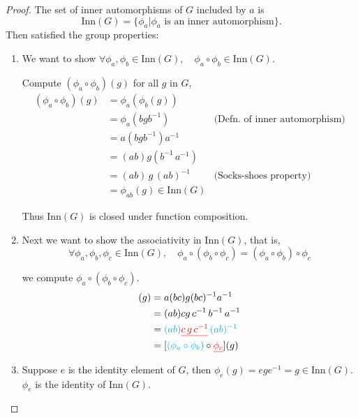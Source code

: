  \begin{proof}
     The set of inner automorphisms of $G$ included by $a$ is 
     \[
         \text{Inn}(G) = \{ \phi_a | \phi_a \text{ is an inner automorphism}  \}.
     \]
     Then satisfied the group properties:
     \begin{enumerate}
         \item We want to show $\forall \phi_a, \phi_b \in \text{Inn}(G), \quad \phi_a \circ \phi_b \in \text{Inn}(G)$.  
 
         Compute $(\phi_a \circ \phi_b)(g)$ for all $g$ in $G$,
         \begin{align*}
             (\phi_a \circ \phi_b)(g) &= \phi_a (\phi_b (g))\\
             &= \phi_a(bgb^{-1}) & \text{(Defn. of inner automorphism)}\\
             &= a(bgb^{-1})a^{-1}\\
             &= (ab)g(b^{-1}\, a^{-1})\\
             &= (ab)\, g\, (ab)^{-1} & \text{(Socks-shoes property)}\\
             &= \phi_{ab}(g) \in \text{Inn}(G)
         \end{align*}
         
         Thus $\text{Inn}(G)$ is closed under function composition.
 
         \item Next we want to show the associativity in $\text{Inn}(G)$, that is, 
         \[
             \forall \phi_a, \phi_b, \phi_c \in \text{Inn}(G), \quad \phi_a \circ (\phi_b \circ \phi_c) = (\phi_a \circ \phi_b) \circ \phi_c 
         \]
 
         we compute $\phi_a \circ (\phi_b \circ \phi_c)$.
         \begin{align*}
             [\phi_a \circ (\phi_b \circ \phi_c)](g) &= a(bc)g(bc)^{-1}a^{-1}\\
             &= (ab)c g \, c^{-1}\, b^{-1}\, a^{-1}\\
             &= {\color{cyan} (ab)}{\color{red} \underline{c\, g\, c^{-1}}}\, {\color{cyan} (ab)^{-1}}\\
             &= [{\color{cyan} (\phi_a \circ \phi_b)} \circ {\color{red} \underline{\phi_c}}](g)
         \end{align*}
 
         \item Suppose $e$ is the identity element of $G$, then $\phi_e(g) = ege^{-1} = g \in \text{Inn}(G)$. $\phi_e$ is the 
         identity of $\text{Inn}(G)$.
 

\end{enumerate}
\end{proof}
